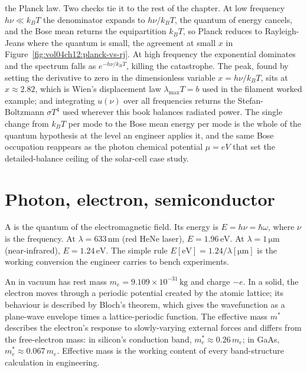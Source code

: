 the Planck law. Two checks tie it to the rest of the chapter. At low
frequency $h\nu \ll k_B T$ the denominator expands to $h\nu/k_B T$, the
quantum of energy cancels, and the Bose mean returns the equipartition
$k_B T$, so Planck reduces to Rayleigh-Jeans where the quantum is small,
the agreement at small $x$ in Figure~\ref{fig:vol04ch12:planck-vs-rj}.
At high frequency the exponential dominates and the spectrum falls as
$e^{-h\nu/k_B T}$, killing the catastrophe. The peak, found by setting
the derivative to zero in the dimensionless variable $x = h\nu/k_B T$,
sits at $x \approx 2.82$, which is Wien's displacement law $\lambda_{\max}
T = b$ used in the filament worked example; and integrating $u(\nu)$ over
all frequencies returns the Stefan-Boltzmann $\sigma T^{4}$ used wherever
this book balances radiated power. The single change from $k_B T$ per mode
to the Bose mean energy per mode is the whole of the quantum hypothesis at
the level an engineer applies it, and the same Bose occupation reappears as
the photon chemical potential $\mu = eV$ that set the detailed-balance
ceiling of the solar-cell case study.



\section{Photon, electron, semiconductor}

A  is the quantum of the electromagnetic field. Its
energy is $E = h\nu = \hbar\omega$, where $\nu$ is the frequency. At
$\lambda = 633\,\si{\nano\meter}$ (red HeNe laser), $E = 1.96\,\si{
\electronvolt}$. At $\lambda = 1\,\si{\micro\meter}$ (near-infrared),
$E = 1.24\,\si{\electronvolt}$. The simple rule $E[\si{\electronvolt}]
= 1.24/\lambda[\si{\micro\meter}]$ is the working conversion the
engineer carries to bench experiments.

An  in vacuum has rest mass $m_{e} = 9.109\times
10^{-31}\,\si{\kilogram}$ and charge $-e$. In a solid, the electron
moves through a periodic potential created by the atomic lattice; its
behaviour is described by Bloch's theorem, which gives the
wavefunction as a plane-wave envelope times a lattice-periodic
function. The effective mass $m^{*}$ describes the electron's
response to slowly-varying external forces and differs from the
free-electron mass: in silicon's conduction band, $m^{*}_{e} \approx
0.26\,m_{e}$; in GaAs, $m^{*}_{e} \approx 0.067\,m_{e}$. Effective
mass is the working content of every band-structure calculation in
engineering.

